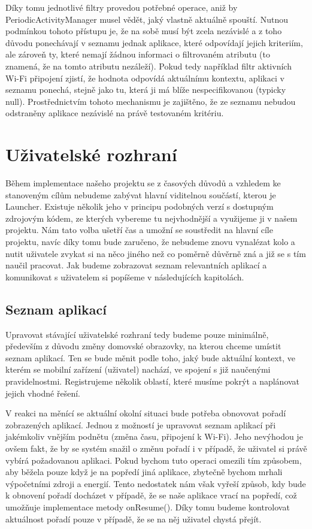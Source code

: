 \documentclass[thesis=M,czech]{FITthesis}[2012/06/26]
\begin{document}
Díky tomu jednotlivé filtry provedou potřebné operace, aniž by PeriodicActivityManager musel vědět, jaký vlastně aktuálně spouští. Nutnou podmínkou tohoto přístupu je, že na sobě musí být zcela nezávislé a z toho důvodu ponechávají v seznamu jednak aplikace, které odpovídají jejich kriteriím, ale zároveň ty, které nemají žádnou informaci o filtrovaném atributu (to znamená, že na tomto atributu nezáleží). Pokud tedy například filtr aktivních Wi-Fi připojení zjistí, že hodnota odpovídá aktuálnímu kontextu, aplikaci v seznamu ponechá, stejně jako tu, která ji má blíže nespecifikovanou (typicky null). Prostřednictvím tohoto mechanismu je zajištěno, že ze seznamu nebudou odstraněny aplikace nezávislé na právě testovaném kritériu.

\section{Uživatelské rozhraní}
Během implementace našeho projektu se z časových důvodů a vzhledem ke stanoveným cílům nebudeme zabývat hlavní viditelnou součástí, kterou je Launcher. Existuje několik jeho v principu podobných verzí s dostupným zdrojovým kódem, ze kterých vybereme tu nejvhodnější a využijeme ji v našem projektu. Nám tato volba ušetří čas a umožní se soustředit na hlavní cíle projektu, navíc díky tomu bude zaručeno, že nebudeme znovu vynalézat kolo a nutit uživatele zvykat si na něco jiného než co poměrně důvěrně zná a již se s tím naučil pracovat. Jak budeme zobrazovat seznam relevantních aplikací a komunikovat s uživatelem si popíšeme v následujících kapitolách.

\subsection{Seznam aplikací}\label{app_list}
Upravovat stávající uživatelské rozhraní tedy budeme pouze minimálně, především z důvodu změny domovské obrazovky, na kterou chceme umístit seznam aplikací. Ten se bude měnit podle toho, jaký bude aktuální kontext, ve kterém se mobilní zařízení (uživatel) nachází, ve spojení s již naučenými pravidelnostmi. Registrujeme několik oblastí, které musíme pokrýt a naplánovat jejich vhodné řešení.

V reakci na měnící se aktuální okolní situaci bude potřeba obnovovat pořadí zobrazených aplikací. Jednou z možností je upravovat seznam aplikací při jakémkoliv vnějším podnětu (změna času, připojení k Wi-Fi). Jeho nevýhodou je ovšem fakt, že by se systém snažil o změnu pořadí i v případě, že uživatel si právě vybírá požadovanou aplikaci. Pokud bychom tuto operaci omezili tím způsobem, aby běžela pouze když je na popředí jiná aplikace, zbytečně bychom mrhali výpočetními zdroji a energií. Tento nedostatek nám však vyřeší způsob, kdy bude k obnovení pořadí docházet v případě, že se naše aplikace vrací na popředí, což umožňuje implementace metody onResume(). Díky tomu budeme kontrolovat aktuálnost pořadí pouze v případě, že se na něj uživatel chystá přejít.
\end{document}

